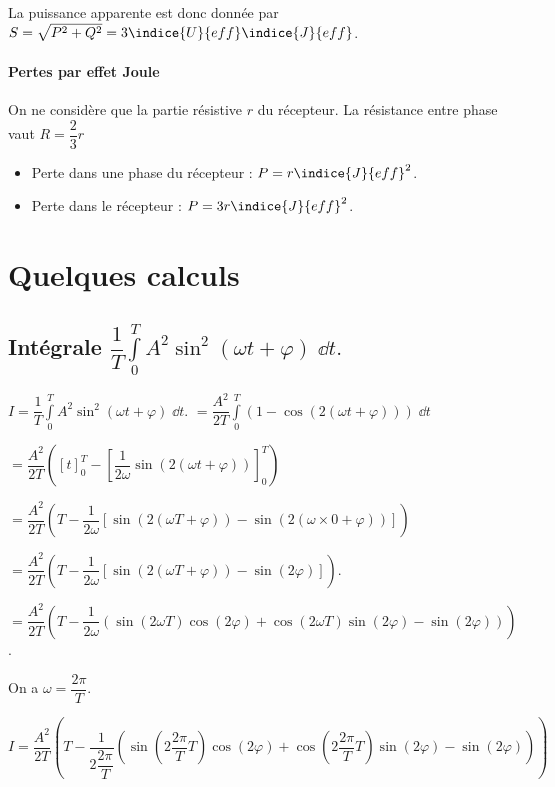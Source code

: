 La puissance apparente est donc donnée par $S = \sqrt{P^2 + Q^2} = 3 \indice{U}{eff}\indice{J}{eff}$.

\paragraph{Pertes par effet Joule}
On ne considère que la partie résistive $r$ du récepteur. La résistance entre phase vaut $R = \dfrac{2}{3}r$ 
\begin{itemize}
\item Perte dans une phase du récepteur : $P = r\indice{J}{eff}^2$.
\item Perte dans le récepteur : $P = 3 r\indice{J}{eff}^2$.
\end{itemize}



\section{Quelques calculs}

\subsection{Intégrale $\dfrac{1}{T} \int\limits_{0}^{T} A^2 \sin^2(\omega t + \varphi)\; \dd t.$ \label{calcul:01}}

$I = \dfrac{1}{T} \int\limits_{0}^{T} A^2 \sin^2(\omega t + \varphi)\; \dd t.$
$= \dfrac{ A^2}{2 T} \int\limits_{0}^{T} \left( 1 - \cos\left( 2\left(\omega t + \varphi\right)\right)\right)\; \dd t$


$= {\dfrac{ A^2}{2 T}\left( \left[t\right]_{0}^{T} -  \left[\dfrac{1}{2\omega}\sin\left( 2\left(\omega t + \varphi\right)\right)\right]_{0}^{T}  \right)}$

$= {\dfrac{ A^2}{2 T}\left( T -  \dfrac{1}{2\omega}\left[
\sin\left( 2\left(\omega T + \varphi\right)\right)
- \sin\left( 2\left(\omega \times 0 + \varphi\right)\right)\right]  \right)}$

$= {\dfrac{ A^2}{2 T}\left( T -  \dfrac{1}{2\omega}\left[
\sin\left( 2\left(\omega T + \varphi\right)\right)
- \sin\left( 2 \varphi\right)\right]  \right)}$. 

$= {\dfrac{ A^2}{2 T}\left( T -  \dfrac{1}{2\omega}\left(
\sin\left( 2\omega T \right)\cos\left( 2\varphi\right)
+\cos\left( 2\omega T \right)\sin\left( 2\varphi\right)
- \sin\left( 2 \varphi\right)\right)  \right)}$. 

On a $\omega = \dfrac{2\pi}{T}$.

$I= {\dfrac{ A^2}{2 T}\left( T -  \dfrac{1}{2\dfrac{2\pi}{T}}\left(
\sin\left( 2\dfrac{2\pi}{T} T \right)\cos\left( 2\varphi\right)
+\cos\left( 2\dfrac{2\pi}{T} T \right)\sin\left( 2\varphi\right)
- \sin\left( 2 \varphi\right)\right)  \right)}$ 

